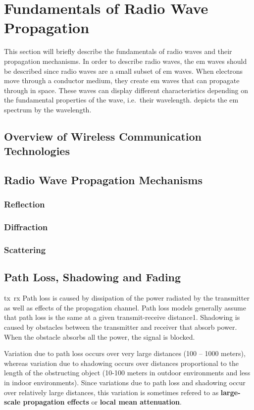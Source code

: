 \section{Fundamentals of Radio Wave Propagation}
\label{sec:fundradioprop}
This section will briefly describe the fundamentals of radio waves and their propagation mechanisms.
In order to describe radio waves, the \gls{em} waves should be described since radio waves are a small subset of \gls{em} waves.
When electrons move through a conductor medium, they create \gls{em}  waves that can propagate through in space.
These waves can display different characteristics depending on the fundamental properties of the wave,  i.e.\ their wavelength.
 depicts the \gls{em} spectrum by the wavelength.

\subsection{Overview of Wireless Communication Technologies}

\subsection{Radio Wave Propagation Mechanisms}
\subsubsection{Reflection}
\subsubsection{Diffraction}
\subsubsection{Scattering}



\subsection{Path Loss, Shadowing and Fading}
\gls{tx}~\gls{rx}
Path loss is caused by dissipation of the power radiated by the transmitter as well as effects of the propagation channel.
Path loss models generally assume that path loss is the same at a given transmit-receive distance1.
Shadowing is caused by obstacles between the transmitter and receiver that absorb power.
When the obstacle absorbs all the power, the signal is blocked.

Variation due to path loss occurs over very large distances (100 -- 1000 meters), whereas variation due to shadowing occurs over distances proportional to the length of the obstructing object (10-100 meters in outdoor environments and less in indoor environments).
Since variations due to path loss and shadowing occur over relatively large distances, this variation is sometimes refered to as \textbf{large-scale propagation effects} or \textbf{local mean attenuation}.

\pagebreak
